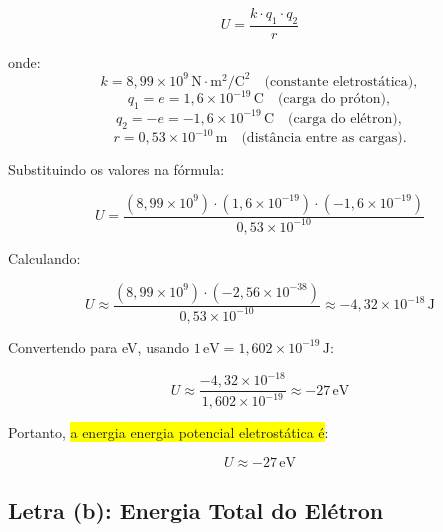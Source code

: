 \documentclass[a4paper,12pt]{article}
\begin{document}
\begin{flushleft}
\begin{equation}
U = \frac{k \cdot q_1 \cdot q_2}{r}
\end{equation}

onde:
\begin{equation}
k = 8,99 \times 10^9 \, \text{N} \cdot \text{m}^2 / \text{C}^2 \quad \text{(constante eletrostática)},
\end{equation}
\begin{equation}
q_1 = e = 1,6 \times 10^{-19} \, \text{C} \quad \text{(carga do próton)},
\end{equation}
\begin{equation}
q_2 = -e = -1,6 \times 10^{-19} \, \text{C} \quad \text{(carga do elétron)},
\end{equation}
\begin{equation}
r = 0,53 \times 10^{-10} \, \text{m} \quad \text{(distância entre as cargas)}.
\end{equation}

Substituindo os valores na fórmula:

\begin{equation}
U = \frac{(8,99 \times 10^9) \cdot (1,6 \times 10^{-19}) \cdot (-1,6 \times 10^{-19})}{0,53 \times 10^{-10}}
\end{equation}

Calculando:

\begin{equation}
U \approx \frac{(8,99 \times 10^9) \cdot (-2,56 \times 10^{-38})}{0,53 \times 10^{-10}} \approx -4,32 \times 10^{-18} \, \text{J}
\end{equation}

Convertendo para eV, usando \( 1 \, \text{eV} = 1,602 \times 10^{-19} \, \text{J} \):

\begin{equation}
U \approx \frac{-4,32 \times 10^{-18}}{1,602 \times 10^{-19}} \approx -27 \, \text{eV}
\end{equation}

Portanto, \colorbox{yellow}{a energia energia potencial eletrostática é}:

\begin{equation}
\boxed{ U \approx -27 \, \text{eV}}
\end{equation}

\subsection*{Letra (b): Energia Total do Elétron}


\end{flushleft}
\end{document}
